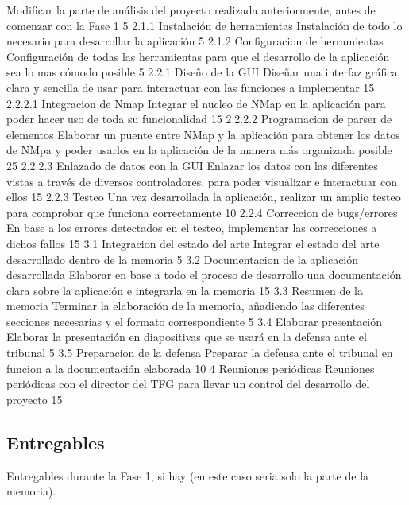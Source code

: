	{Modificar la parte de análisis del proyecto realizada anteriormente, antes de comenzar con la Fase 1}
	{5}					
\taskframe
	{2.1.1}
	{Instalación de herramientas}
	{Instalación de todo lo necesario para desarrollar la aplicación}
	{5}
\taskframe
	{2.1.2}
	{Configuracion de herramientas}
	{Configuración de todas las herramientas para que el desarrollo de la aplicación sea lo mas cómodo posible}
	{5}
\taskframe
	{2.2.1}
	{Diseño de la GUI}
	{Diseñar una interfaz gráfica clara y sencilla de usar para interactuar con las funciones a implementar}
	{15}
\taskframe
	{2.2.2.1}
	{Integracion de Nmap}
	{Integrar el nucleo de NMap en la aplicación para poder hacer uso de toda su funcionalidad}
	{15}
\taskframe
	{2.2.2.2}
	{Programacion de parser de elementos}
	{Elaborar un puente entre NMap y la aplicación para obtener los datos de NMpa y poder usarlos en la aplicación de la manera más organizada posible}
	{25}
\taskframe
	{2.2.2.3}
	{Enlazado de datos con la GUI}
	{Enlazar los datos con las diferentes vistas a través de diversos controladores, para poder visualizar e interactuar con ellos}
	{15}
\taskframe
	{2.2.3}
	{Testeo}
	{Una vez desarrollada la aplicación, realizar un amplio testeo para comprobar que funciona correctamente}
	{10}
\taskframe
	{2.2.4}
	{Correccion de bugs/errores}
	{En base a los errores detectados en el testeo, implementar las correcciones a dichos fallos}
	{15}
\taskframe
	{3.1}
	{Integracion del estado del arte}
	{Integrar el estado del arte desarrollado dentro de la memoria}
	{5}
\taskframe
	{3.2}
	{Documentacion de la aplicación desarrollada}
	{Elaborar en base a todo el proceso de desarrollo una documentación clara sobre la aplicación e integrarla en la memoria}
	{15}
\taskframe
	{3.3}
	{Resumen de la memoria}
	{Terminar la elaboración de la memoria, añadiendo las diferentes secciones necesarias y el formato correspondiente}
	{5}
\taskframe
	{3.4}
	{Elaborar presentación}
	{Elaborar la presentación en diapositivas que se usará en la defensa ante el tribunal}
	{5}
\taskframe
	{3.5}
	{Preparacion de la defensa}
	{Preparar la defensa ante el tribunal en funcion a la documentación elaborada}
	{10}
\taskframe
	{4}
	{Reuniones periódicas}
	{Reuniones periódicas con el director del TFG para llevar un control del desarrollo del proyecto}
	{15}

\subsection{Entregables}
{\color{red} Entregables durante la Fase 1, si hay (en este caso seria solo la parte de la memoria).}

